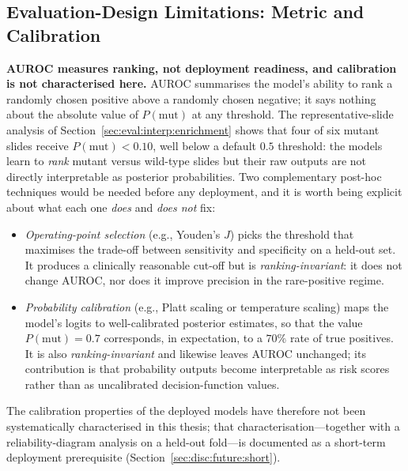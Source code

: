 \subsection{Evaluation-Design Limitations: Metric and Calibration}
\label{sec:eval:lim:design}

\textbf{AUROC measures ranking, not deployment readiness, and
calibration is not characterised here.}
AUROC summarises the model's ability to rank a randomly chosen
positive above a randomly chosen negative; it says nothing about
the absolute value of $P(\text{mut})$ at any threshold.
The representative-slide analysis of
Section~\ref{sec:eval:interp:enrichment} shows that four of six
mutant slides receive $P(\text{mut}) < 0.10$, well below a default
$0.5$ threshold: the models learn to \emph{rank} mutant versus
wild-type slides but their raw outputs are not directly
interpretable as posterior probabilities.
Two complementary post-hoc techniques would be needed before any
deployment, and it is worth being explicit about what each one
\emph{does} and \emph{does not} fix:
\begin{itemize}
    \item \textit{Operating-point selection} (e.g., Youden's $J$)
    picks the threshold that maximises the trade-off between
    sensitivity and specificity on a held-out set.
    It produces a clinically reasonable cut-off but is
    \emph{ranking-invariant}: it does not change AUROC, nor does
    it improve precision in the rare-positive regime.
    \item \textit{Probability calibration} (e.g., Platt scaling
    or temperature scaling) maps the model's logits to
    well-calibrated posterior estimates, so that the value
    $P(\text{mut})=0.7$ corresponds, in expectation, to a $70\%$
    rate of true positives.
    It is also \emph{ranking-invariant} and likewise leaves AUROC
    unchanged; its contribution is that probability outputs
    become interpretable as risk scores rather than as
    uncalibrated decision-function values.
\end{itemize}
The calibration properties of the deployed models have therefore
not been systematically characterised in this thesis; that
characterisation---together with a reliability-diagram analysis on
a held-out fold---is documented as a short-term deployment
prerequisite (Section~\ref{sec:disc:future:short}).

